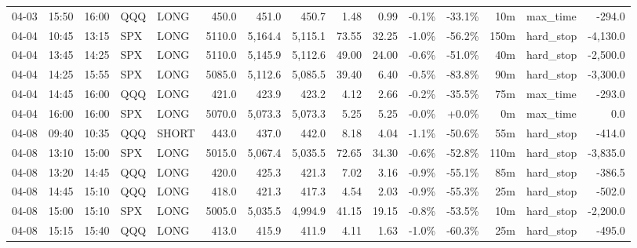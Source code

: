 \documentclass[11pt,a4paper,twoside]{article}
\begin{document}
\begin{landscape}
\begin{center}
\begin{longtable}{>{\color{txtmain}}l l l l l r r r r r r r r >{\color{txtmain}}l r}
04-03 & 15:50 & 16:00 & QQQ & LONG & 450.0 & 451.0 & 450.7 & 1.48 & 0.99 & \textcolor{lossred}{-0.1\%} & \textcolor{lossred}{-33.1\%} & 10m & max\_time & \textcolor{lossred}{-294.0} \\
04-04 & 10:45 & 13:15 & SPX & LONG & 5110.0 & 5,164.4 & 5,115.1 & 73.55 & 32.25 & \textcolor{lossred}{-1.0\%} & \textcolor{lossred}{-56.2\%} & 150m & hard\_stop & \textcolor{lossred}{-4,130.0} \\
04-04 & 13:45 & 14:25 & SPX & LONG & 5110.0 & 5,145.9 & 5,112.6 & 49.00 & 24.00 & \textcolor{lossred}{-0.6\%} & \textcolor{lossred}{-51.0\%} & 40m & hard\_stop & \textcolor{lossred}{-2,500.0} \\
04-04 & 14:25 & 15:55 & SPX & LONG & 5085.0 & 5,112.6 & 5,085.5 & 39.40 & 6.40 & \textcolor{lossred}{-0.5\%} & \textcolor{lossred}{-83.8\%} & 90m & hard\_stop & \textcolor{lossred}{-3,300.0} \\
04-04 & 14:45 & 16:00 & QQQ & LONG & 421.0 & 423.9 & 423.2 & 4.12 & 2.66 & \textcolor{lossred}{-0.2\%} & \textcolor{lossred}{-35.5\%} & 75m & max\_time & \textcolor{lossred}{-293.0} \\
04-04 & 16:00 & 16:00 & SPX & LONG & 5070.0 & 5,073.3 & 5,073.3 & 5.25 & 5.25 & \textcolor{lossred}{-0.0\%} & \textcolor{wingreen}{+0.0\%} & 0m & max\_time & \textcolor{wingreen}{0.0} \\
04-08 & 09:40 & 10:35 & QQQ & SHORT & 443.0 & 437.0 & 442.0 & 8.18 & 4.04 & \textcolor{lossred}{-1.1\%} & \textcolor{lossred}{-50.6\%} & 55m & hard\_stop & \textcolor{lossred}{-414.0} \\
04-08 & 13:10 & 15:00 & SPX & LONG & 5015.0 & 5,067.4 & 5,035.5 & 72.65 & 34.30 & \textcolor{lossred}{-0.6\%} & \textcolor{lossred}{-52.8\%} & 110m & hard\_stop & \textcolor{lossred}{-3,835.0} \\
04-08 & 13:20 & 14:45 & QQQ & LONG & 420.0 & 425.3 & 421.3 & 7.02 & 3.16 & \textcolor{lossred}{-0.9\%} & \textcolor{lossred}{-55.1\%} & 85m & hard\_stop & \textcolor{lossred}{-386.5} \\
04-08 & 14:45 & 15:10 & QQQ & LONG & 418.0 & 421.3 & 417.3 & 4.54 & 2.03 & \textcolor{lossred}{-0.9\%} & \textcolor{lossred}{-55.3\%} & 25m & hard\_stop & \textcolor{lossred}{-502.0} \\
04-08 & 15:00 & 15:10 & SPX & LONG & 5005.0 & 5,035.5 & 4,994.9 & 41.15 & 19.15 & \textcolor{lossred}{-0.8\%} & \textcolor{lossred}{-53.5\%} & 10m & hard\_stop & \textcolor{lossred}{-2,200.0} \\
04-08 & 15:15 & 15:40 & QQQ & LONG & 413.0 & 415.9 & 411.9 & 4.11 & 1.63 & \textcolor{lossred}{-1.0\%} & \textcolor{lossred}{-60.3\%} & 25m & hard\_stop & \textcolor{lossred}{-495.0} \\

\end{longtable}
\end{center}
\end{landscape}
\end{document}
